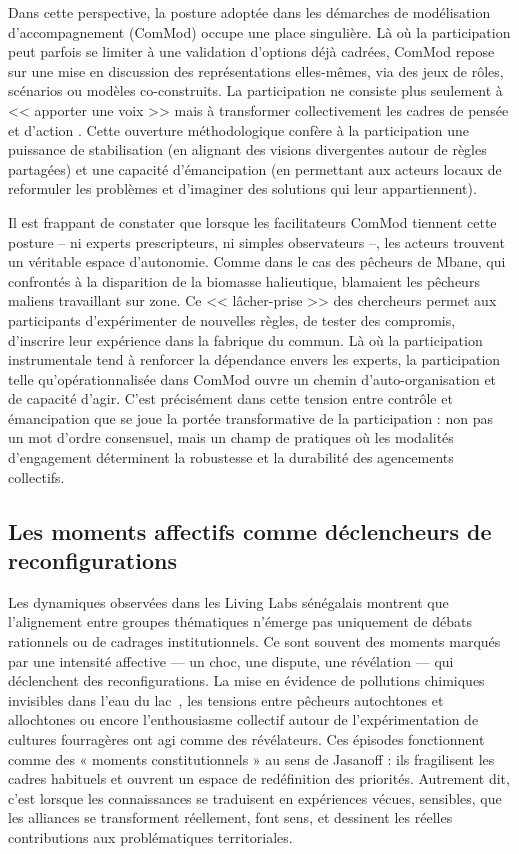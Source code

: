 \documentclass{article}
\begin{document}
Dans cette perspective, la posture adoptée dans les démarches de modélisation d’accompagnement (ComMod) \parencite{barreteau_our_2003, barreteau_framework_2010}  occupe une place singulière. Là où la participation peut parfois se limiter à une validation d’options déjà cadrées, ComMod repose sur une mise en discussion des représentations elles-mêmes, via des jeux de rôles, scénarios ou modèles co-construits. La participation ne consiste plus seulement à << apporter une voix >> mais à transformer collectivement les cadres de pensée et d’action \parencite{etienne_modepour_2010}. Cette ouverture méthodologique confère à la participation une puissance de stabilisation (en alignant des visions divergentes autour de règles partagées) et une capacité d’émancipation (en permettant aux acteurs locaux de reformuler les problèmes et d’imaginer des solutions qui leur appartiennent).

Il est frappant de constater que lorsque les facilitateurs ComMod tiennent cette posture -- ni experts prescripteurs, ni simples observateurs --, les acteurs trouvent un véritable espace d’autonomie. Comme dans le cas des pêcheurs de Mbane, qui confrontés à la disparition de la biomasse halieutique, blamaient les pêcheurs maliens travaillant sur zone. Ce << lâcher-prise >> des chercheurs permet aux participants d’expérimenter de nouvelles règles, de tester des compromis, d’inscrire leur expérience dans la fabrique du commun. Là où la participation instrumentale tend à renforcer la dépendance envers les experts, la participation telle qu’opérationnalisée dans ComMod ouvre un chemin d’auto-organisation et de capacité d’agir. C’est précisément dans cette tension entre contrôle et émancipation que se joue la portée transformative de la participation : non pas un mot d’ordre consensuel, mais un champ de pratiques où les modalités d’engagement déterminent la robustesse et la durabilité des agencements collectifs.

\subsection{Les moments affectifs comme déclencheurs de reconfigurations}

Les dynamiques observées dans les Living Labs sénégalais montrent que l’alignement entre groupes thématiques n’émerge pas uniquement de débats rationnels ou de cadrages institutionnels. Ce sont souvent des moments marqués par une intensité affective — un choc, une dispute, une révélation — qui déclenchent des reconfigurations. La mise en évidence de pollutions chimiques invisibles dans l’eau du lac~\parencite{}, les tensions entre pêcheurs autochtones et allochtones ou encore l’enthousiasme collectif autour de l’expérimentation de cultures fourragères ont agi comme des révélateurs. Ces épisodes fonctionnent comme des « moments constitutionnels » au sens de Jasanoff : ils fragilisent les cadres habituels et ouvrent un espace de redéfinition des priorités. Autrement dit, c’est lorsque les connaissances se traduisent en expériences vécues, sensibles, que les alliances se transforment réellement, font sens, et dessinent les réelles contributions aux problématiques territoriales.
\end{document}
